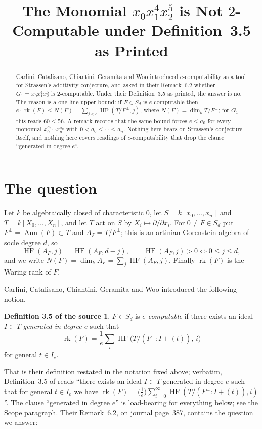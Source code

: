 \documentclass[11pt]{amsart}
\title[Not $2$-computable under Definition~3.5 as printed]
{The Monomial $x_0x_1^4x_2^5$ is Not $2$-Computable under Definition~3.5 as Printed}
\date{}
\theoremstyle{remark}
\theoremstyle{definition}
\newtheorem*{definition}{Definition 3.5 of the source}
\DeclareMathOperator{\rk}{rk}
\DeclareMathOperator{\HF}{HF}
\newcommand{\perpp}{^{\perp}}
\begin{document}
\begin{abstract}
Carlini, Catalisano, Chiantini, Geramita and Woo introduced $e$-computability as a tool for
Strassen's additivity conjecture, and asked in their Remark~6.2 whether $G_1=x_0x_1^4x_2^5$ is
$2$-computable. Under their Definition~3.5 as printed, the answer is no. The reason is a
one-line upper bound: if $F\in S_d$ is $e$-computable then
$e\cdot\rk(F)\le N(F)-\sum_{j<e}\HF(T/F\perpp,j)$, where $N(F)=\dim_k T/F\perpp$; for $G_1$ this
reads $60\le 56$. A remark records that the same bound forces $e\le a_0$ for every monomial
$x_0^{a_0}\cdots x_n^{a_n}$ with $0<a_0\le\cdots\le a_n$. Nothing here bears on Strassen's
conjecture itself, and nothing here covers readings of $e$-computability that drop the clause
``generated in degree $e$''.
\end{abstract}

\maketitle

\section{The question}

Let $k$ be algebraically closed of characteristic $0$, let $S=k[x_0,\dots,x_n]$ and
$T=k[X_0,\dots,X_n]$, and let $T$ act on $S$ by $X_i\mapsto\partial/\partial x_i$. For
$0\ne F\in S_d$ put $F\perpp=\operatorname{Ann}(F)\subset T$ and $A_F=T/F\perpp$; this is an
artinian Gorenstein algebra of socle degree $d$, so
\[
 \HF(A_F,j)=\HF(A_F,d-j),
 \qquad
 \HF(A_F,j)>0 \iff 0\le j\le d,
\]
and we write $N(F)=\dim_kA_F=\sum_j\HF(A_F,j)$. Finally $\rk(F)$ is the Waring rank of $F$.

Carlini, Catalisano, Chiantini, Geramita and Woo \cite{CCCGW} introduced the following notion.

\begin{definition}
$F\in S_d$ is \emph{$e$-computable} if there exists an ideal $I\subset T$
\emph{generated in degree $e$} such that
\begin{equation}\label{eq:ecomp}
 \rk(F)=\frac1e\sum_i\HF\bigl(T/(F\perpp:I+(t)),\,i\bigr)
\end{equation}
for general $t\in I_e$.
\end{definition}

\noindent
That is their definition restated in the notation fixed above; verbatim, Definition~3.5 of
\cite{CCCGW} reads ``there exists an ideal $I\subset T$ generated in degree $e$ such that for
general $t\in I_e$ we have
$\rk(F)=\bigl(\tfrac1e\bigr)\sum_{i=0}^{\infty}\HF(T/(F\perpp:I+(t)),i)$''. The clause
``generated in degree $e$'' is load-bearing for everything below; see the Scope paragraph. Their
Remark~6.2, on journal page~387, contains the question we answer:
\end{document}
